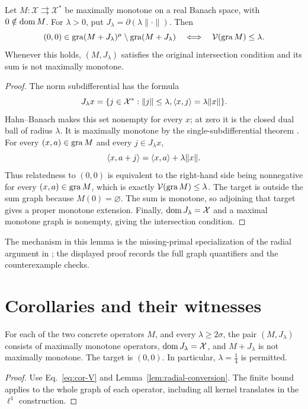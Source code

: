 \begin{lemma}\label{lem:radial-conversion}
Let $M:\mathcal X\rightrightarrows\mathcal X^*$ be maximally monotone
on a real Banach space, with $0\notin\operatorname{dom} M$. For $\lambda>0$, put
$J_\lambda=\partial(\lambda\|\cdot\|)$. Then
\begin{equation}
(0,0)\in\operatorname{gra}(M+J_\lambda)^\mu\setminus\operatorname{gra}(M+J_\lambda)
\quad\Longleftrightarrow\quad
\mathcal V(\operatorname{gra} M)\le\lambda.
\label{eq:cor-exact-radial}
\end{equation}
Whenever this holds, $(M,J_\lambda)$ satisfies the original intersection
condition and its sum is not maximally monotone.
\end{lemma}
\begin{proof}
The norm subdifferential has the formula
\[
J_\lambda x=\{j\in\mathcal X^*: \|j\|\le\lambda,
                         \langle x,j\rangle=\lambda\|x\|\}.
\]
Hahn--Banach makes this set nonempty for every $x$; at zero it is the
closed dual ball of radius $\lambda$. It is maximally monotone by the
single-subdifferential theorem \cite[Theorem~A]{rockafellar1970subdiff}.
For every $(x,a)\in\operatorname{gra} M$ and every $j\in J_\lambda x$,
\[
\langle x,a+j\rangle=\langle x,a\rangle+\lambda\|x\|.
\]
Thus relatedness to $(0,0)$ is equivalent to the right-hand side being
nonnegative for every $(x,a)\in\operatorname{gra} M$, which is exactly
$\mathcal V(\operatorname{gra} M)\le\lambda$. The target is outside the sum graph
because $M(0)=\varnothing$. The sum is monotone, so adjoining that target
gives a proper monotone extension. Finally, $\operatorname{dom} J_\lambda=\mathcal X$
and a maximal monotone graph is nonempty, giving the intersection condition.
\end{proof}
The mechanism in this lemma is the missing-primal specialization of the
radial argument in \cite[Theorem~1.2, proof]{verona2008}; the displayed
proof records the full graph quantifiers and the counterexample checks.

\section{Corollaries and their witnesses}
\begin{corollary}\label{cor:radial}
For each of the two concrete operators $M$, and every $\lambda\ge2\sigma$,
the pair $(M,J_\lambda)$ consists of maximally monotone operators,
$\operatorname{dom} J_\lambda=\mathcal X$, and $M+J_\lambda$ is not maximally monotone.
The target is $(0,0)$. In particular, $\lambda=\frac{1}{4}$ is permitted.
\end{corollary}
\begin{proof}
Use Eq.~\eqref{eq:cor-V} and Lemma~\ref{lem:radial-conversion}.
The finite bound applies to the whole graph of each operator, including
all kernel translates in the $\ell^1$ construction.
\end{proof}

